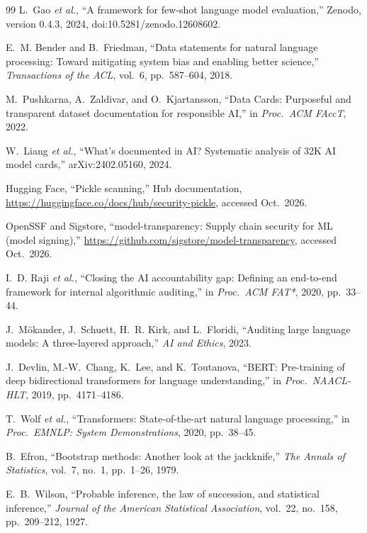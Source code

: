 \begin{thebibliography}{99}
 L.~Gao \emph{et al.}, ``A framework for few-shot language model evaluation,'' Zenodo, version 0.4.3, 2024, doi:10.5281/zenodo.12608602.

 E.~M. Bender and B.~Friedman, ``Data statements for natural language processing: Toward mitigating system bias and enabling better science,'' \emph{Transactions of the ACL}, vol.~6, pp.~587--604, 2018.

 M.~Pushkarna, A.~Zaldivar, and O.~Kjartansson, ``Data Cards: Purposeful and transparent dataset documentation for responsible AI,'' in \emph{Proc.\ ACM FAccT}, 2022.

 W.~Liang \emph{et al.}, ``What's documented in AI? Systematic analysis of 32K AI model cards,'' arXiv:2402.05160, 2024.

 Hugging Face, ``Pickle scanning,'' Hub documentation, \url{https://huggingface.co/docs/hub/security-pickle}, accessed Oct.\ 2026.

 OpenSSF and Sigstore, ``model-transparency: Supply chain security for ML (model signing),'' \url{https://github.com/sigstore/model-transparency}, accessed Oct.\ 2026.

 I.~D. Raji \emph{et al.}, ``Closing the AI accountability gap: Defining an end-to-end framework for internal algorithmic auditing,'' in \emph{Proc.\ ACM FAT*}, 2020, pp.~33--44.

 J.~M\"okander, J.~Schuett, H.~R. Kirk, and L.~Floridi, ``Auditing large language models: A three-layered approach,'' \emph{AI and Ethics}, 2023.

 J.~Devlin, M.-W.~Chang, K.~Lee, and K.~Toutanova, ``BERT: Pre-training of deep bidirectional transformers for language understanding,'' in \emph{Proc.\ NAACL-HLT}, 2019, pp.~4171--4186.

 T.~Wolf \emph{et al.}, ``Transformers: State-of-the-art natural language processing,'' in \emph{Proc.\ EMNLP: System Demonstrations}, 2020, pp.~38--45.


 B.~Efron, ``Bootstrap methods: Another look at the jackknife,'' \emph{The Annals of Statistics}, vol.~7, no.~1, pp.~1--26, 1979.

 E.~B.~Wilson, ``Probable inference, the law of succession, and statistical inference,'' \emph{Journal of the American Statistical Association}, vol.~22, no.~158, pp.~209--212, 1927.


\end{thebibliography}
